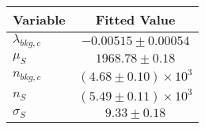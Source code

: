 \begin{tabular}[t]{lc}
\hline
Variable &Fitted Value\\
\hline\hline
$\lambda_{bkg,c}$&$-0.00515\pm0.00054$\\
\hline
$\mu_{S}$&$1968.78\pm0.18$\\
\hline
$n_{bkg,c}$&$(4.68\pm0.10)\times 10^3$\\
\hline
$n_{S}$&$(5.49\pm0.11)\times 10^3$\\
\hline
$\sigma_{S}$&$9.33\pm0.18$\\
\hline
\end{tabular}